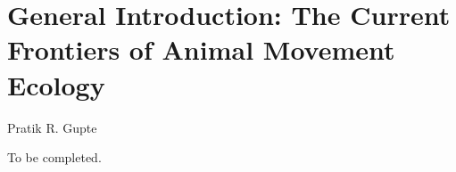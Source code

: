 
{}%
\chapter{General Introduction: The Current Frontiers of Animal Movement Ecology}\label{ch:introduction}

{{Pratik R. Gupte}}




To be completed.

\vfill

\clearpage
